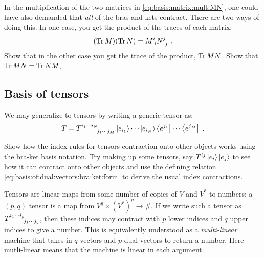 \documentclass[12pt, oneside]{report}    %
\begin{document}
\begin{exercise}\label{eq:matrix:product:trace}
In the multiplication of the two matrices in \eqref{eq:basis:matrix:mult:MN}, one could have also demanded that \emph{all} of the bras and kets contract. There are two ways of doing this. In one case, you get the product of the traces of each matrix:
\begin{align}
    (\Tr{M})(\Tr{N}) = M\aij{i}{i} N\aij{j}{j} \ .
\end{align}
Show that in the other case you get the trace of the product, $\operatorname{\textnormal{Tr}}{MN}$. Show that $\operatorname{\textnormal{Tr}}{MN} = \operatorname{\textnormal{Tr}}{NM}$.
\end{exercise}




 \subsection{Basis of tensors}

 We may generalize to tensors by writing a generic tensor as:
 \begin{align}
    T =
     T\aij{i_1\cdots i_N}{j_1\cdots j_M}
     \ket{e_{i_1}}\cdots \ket{e_{i_N}}
     \bra{e^{j_1}}\cdots \bra{e^{j_M}} \ .
     \label{eq:tensor:T:with:basis}
 \end{align}
\begin{exercise}
Show how the index rules for tensors contraction onto other objects works using the bra-ket basis notation. Try making up some tensors, say $T^{ij} \left|e_i\right\rangle\left|e_j\right\rangle$ to see how it can contract onto other objects and use the defining relation \eqref{eq:basis:of:dual:vectors:bra:ket:form} to derive the usual index contractions. 
\end{exercise}

\begin{bigidea}\label{idea:tensor:as:function}
Tensors are linear maps from some number of copies of $V$ and $V^*$ to numbers: a $(p,q)$ tensor is a map from $V^q \times (V^*)^p \to \#$. If we write such a tensor as $T\aij{i_1\cdots i_p}{j_1\cdots j_q}$, then these indices may contract with $p$ lower indices and $q$ upper indices to give a number. This is equivalently understood as a \emph{multi-linear} machine that takes in $q$ vectors and $p$ dual vectors to return a number. Here mutli-linear means that the machine is linear in each argument. 
\end{bigidea}
\end{document}
